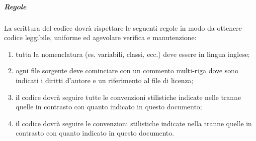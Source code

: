             \subparagraph{Regole}
   			La scrittura del codice dovrà rispettare le seguenti regole in modo da ottenere codice leggibile, uniforme ed agevolare verifica e manutenzione:
   			\begin{enumerate}
                \item tutta la nomenclatura (es. variabili, classi, ecc.) deve essere in lingua inglese;
                \item ogni file sorgente deve cominciare con un commento multi-riga dove sono indicati i diritti d'autore e un riferimento al file di licenza;
                \item il codice  dovrà seguire tutte le convenzioni stilistiche indicate nelle  tranne quelle in contrasto con quanto indicato in questo documento;
                \item il codice  dovrà seguire le convenzioni stilistiche indicate nella  tranne quelle in contrasto con quanto indicato in questo documento.
            \end{enumerate}

